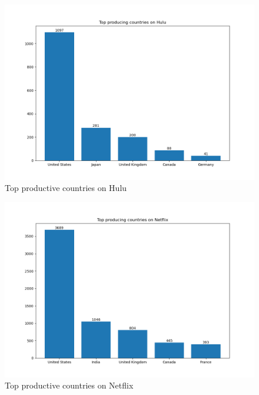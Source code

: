 \documentclass{article}
\begin{document}
\begin{figure}[!htb]
	\centering
	\includegraphics[scale=0.5]{../producing_countries/Hulu_producing_countries.png}
	\caption{Top productive countries on Hulu}
	\label{fig:top_produtive_countries_hulu}
\end{figure}
\begin{figure}[!htb]
	\centering
	\includegraphics[scale=0.5]{../producing_countries/Netflix_producing_countries.png}
	\caption{Top productive countries on Netflix}
	\label{fig:top_produtive_countries_netflix}
\end{figure}
\end{document}
